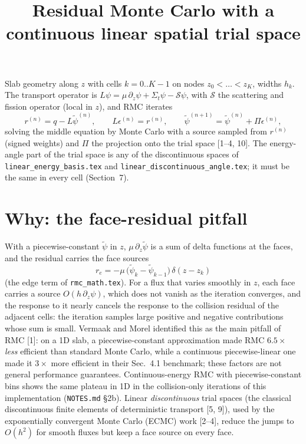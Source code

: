 \documentclass[11pt]{article}
\title{Residual Monte Carlo with a continuous linear spatial trial space}
\date{}
\newcommand{\tpsi}{\tilde\psi}
\newcommand{\Sigt}{\Sigma_t}
\begin{document}
\maketitle

\noindent Slab geometry along $z$ with cells $k=0..K-1$ on nodes $z_0<\dots<z_K$,
widths $h_k$. The transport operator is
$L\psi = \mu\,\partial_z\psi + \Sigt\psi - \mathcal S\psi$, with $\mathcal S$ the
scattering and fission operator (local in $z$), and RMC iterates
\begin{equation}
  r^{(n)} = q - L\tpsi^{(n)},\qquad L\epsilon^{(n)} = r^{(n)},\qquad
  \tpsi^{(n+1)} = \tpsi^{(n)} + \Pi\epsilon^{(n)},
\end{equation}
solving the middle equation by Monte Carlo with a source sampled from $r^{(n)}$ (signed
weights) and $\Pi$ the projection onto the trial space [1--4, 10]. The energy-angle part
of the trial space is any of the discontinuous spaces of
\texttt{linear\_energy\_basis.tex} and \texttt{linear\_discontinuous\_angle.tex}; it
must be the same in every cell (Section~7).

\section{Why: the face-residual pitfall}

With a piecewise-constant $\tpsi$ in $z$, $\mu\,\partial_z\tpsi$ is a sum of delta
functions at the faces, and the residual carries the face sources
\begin{equation}
  r_e = -\mu\,\big(\tpsi_{k}-\tpsi_{k-1}\big)\,\delta(z-z_k)
\end{equation}
(the edge term of \texttt{rmc\_math.tex}). For a flux that varies smoothly in $z$, each
face carries a source $O(h\,\partial_z\psi)$, which does not vanish as the iteration
converges, and the response to it nearly cancels the response to the collision residual
of the adjacent cells: the iteration samples large positive and negative contributions
whose sum is small. Vermaak and Morel identified this as the main pitfall of RMC [1]:
on a 1D slab, a piecewise-constant approximation made RMC $6.5\times$ \emph{less}
efficient than standard Monte Carlo, while a continuous piecewise-linear one made it
$3\times$ more efficient in their Sec.~4.1 benchmark; these factors are not general
performance guarantees. Continuous-energy RMC with piecewise-constant bins shows the same
plateau in 1D in the collision-only iterations of this implementation
(\texttt{NOTES.md} \S2b). Linear \emph{discontinuous} trial spaces (the classical discontinuous
finite elements of deterministic transport [5, 9]), used by the exponentially
convergent Monte Carlo (ECMC) work [2--4], reduce the jumps to
$O(h^2)$ for smooth fluxes but keep a face source on every face.
\end{document}
